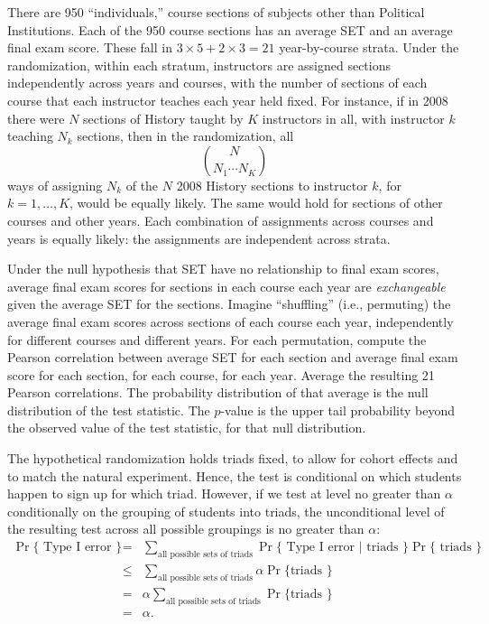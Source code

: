 \documentclass[12pt]{article}
\newcommand{\beq}{\begin{equation}}
\newcommand{\eeq}{\end{equation}}
\begin{document}
There are 950 ``individuals,'' course sections of subjects other
than Political Institutions.
Each of the 950 course sections has an average SET and an average final exam score.
These fall in $3\times5 + 2 \times 3 = 21$ year-by-course strata.
Under the randomization, within each stratum, instructors
are assigned sections independently across years and courses, with
the number of sections of each course that each instructor teaches each year held fixed.
For instance, if in 2008 there were $N$ sections of History taught by $K$ instructors in all,
with instructor $k$ teaching $N_k$ sections, then in the randomization,
all
\beq
    {N}\choose{N_1 \cdots N_K}
\eeq
ways of assigning $N_k$ of the $N$ 2008 History sections to instructor $k$, for 
$k=1, \ldots, K$,
would be equally likely.
The same would hold for sections of other courses and other years.
Each combination of assignments across courses and years is equally likely:
the assignments are independent across strata.

Under the null hypothesis that SET have no relationship to final exam scores,
average final exam scores for sections in each course each year are \emph{exchangeable} 
given the average SET for the sections.
Imagine ``shuffling'' (i.e., permuting)
the average final exam scores across sections of each course
each year, independently
for different courses and different years.
For each permutation, compute the Pearson correlation between average SET for each section
and average final exam score for each section, for each course, for each year.
Average the resulting 21 Pearson correlations.
The probability distribution of that average is the null distribution of the test statistic.
The $p$-value is the upper tail probability beyond the observed value of the 
test statistic, for that null distribution.

The hypothetical randomization holds triads fixed, to allow for cohort effects
and to match the natural experiment.
Hence, the test is conditional on which students happen to sign up for which triad.
However, if we test at level no greater than $\alpha$ conditionally 
on the grouping of students into triads, 
the unconditional level of the resulting test across all possible groupings is no 
greater than $\alpha$:
\begin{eqnarray}
   \Pr \{ \mbox{ Type I error } \} &=& \sum_{\mbox{all possible sets of triads}} 
   \Pr \{ \mbox{ Type I error } | \mbox{ triads } \} \Pr\{\mbox{ triads } \} \nonumber \\
   &\le& 
    \sum_{\mbox{all possible sets of triads}} \alpha \Pr\{\mbox{triads } \} \nonumber \\
    &=& \alpha \sum_{\mbox{all possible sets of triads}} \Pr\{\mbox{triads } \} \nonumber \\
    &=& \alpha.
\end{eqnarray}
\end{document}
